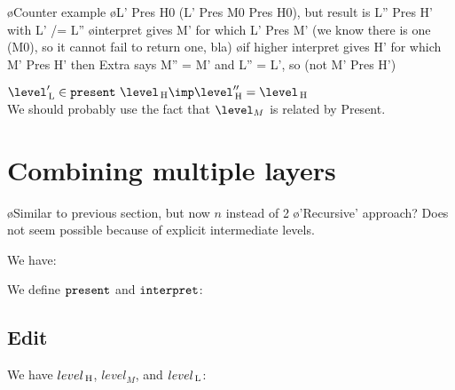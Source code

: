 \bl
\o Counter example
\o L' Pres H0 (L' Pres M0 Pres H0), but result is L'' Pres H' with L' /= L''
\o interpret gives M' for which L' Pres M' (we know there is one (M0), so it cannot fail to return one, bla)
\o if higher interpret gives H' for which M' Pres H' then Extra says M'' = M' and L'' = L', so (not M' Pres H')
\el


$\level'\L \in \present~\level\H \imp \level''\H = \level\H$\\
We should probably use the fact that $\level_M$ is related by {\sc Present}.







\bc
%																
%																
%																
\section{Combining multiple layers}

\bl
\o Similar to previous section, but now $n$ instead of 2
\o 'Recursive' approach? Does not seem possible because of explicit intermediate levels.
\el

We have:


We define ${\tt present}$ and ${\tt interpret}$:





\subsection{Edit}

We have $level_{\, \mathrm H}$, $level_M$, and $level_{\, \mathrm L}$:


